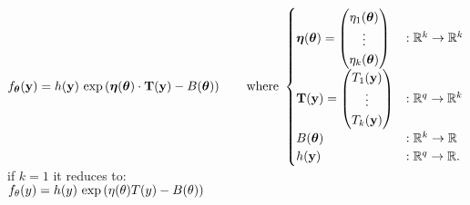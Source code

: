 $\displaystyle  \displaystyle f_{\boldsymbol \theta }(\mathbf{y})=h(\mathbf{y})\, \exp \left({\boldsymbol \eta }({\boldsymbol \theta })\cdot \mathbf{T}(\mathbf{y})-B({\boldsymbol \theta })\right)\qquad \text {where } \\ \begin{cases}  {\boldsymbol \eta }({\boldsymbol \theta })=\begin{pmatrix} \eta _1({\boldsymbol \theta })\\ \vdots \\ \eta _ k({\boldsymbol \theta })\end{pmatrix}& :\mathbb {R}^ k\to \mathbb {R}^ k\\ \mathbf{T}(\mathbf{y})=\begin{pmatrix} T_1(\mathbf{y})\\ \vdots \\ T_ k(\mathbf{y})\end{pmatrix}& :\mathbb {R}^ q\to \mathbb {R}^ k\\ B({\boldsymbol \theta })& :\mathbb {R}^ k\to \mathbb {R}\\ h(\mathbf{y})& :\mathbb {R}^ q\to \mathbb {R}.\\ \end{cases}$\\


if $k=1$ it reduces to:\\

$\displaystyle  \displaystyle f_\theta (y)=h(y)\, \exp \left(\eta (\theta ) T(y)-B(\theta )\right)$

